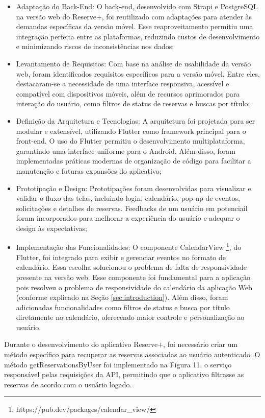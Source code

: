 \documentclass[12pt]{article}
\begin{document}
\begin{itemize}
    \item Adaptação do Back-End: O back-end, desenvolvido com Strapi e PostgreSQL na versão web do Reserve+, foi reutilizado com adaptações para atender às demandas específicas da versão móvel. Esse reaproveitamento permitiu uma integração perfeita entre as plataformas, reduzindo custos de desenvolvimento e minimizando riscos de inconsistências nos dados;
    \item Levantamento de Requisitos: Com base na análise de usabilidade da versão web, foram identificados requisitos específicos para a versão móvel. Entre eles, destacaram-se a necessidade de uma interface responsiva, acessível e compatível com dispositivos móveis, além de recursos aprimorados para interação do usuário, como filtros de status de reservas e buscas por título;
    \item Definição da Arquitetura e Tecnologias: A arquitetura foi projetada para ser modular e extensível, utilizando Flutter como framework principal para o front-end. O uso do Flutter permitiu o desenvolvimento multiplataforma, garantindo uma interface uniforme para o Android. Além disso, foram implementadas práticas modernas de organização de código para facilitar a manutenção e futuras expansões do aplicativo;
    \item Prototipação e Design: Prototipações foram desenvolvidas para visualizar e validar o fluxo das telas, incluindo login, calendário, pop-up de eventos, solicitações e detalhes de reservas. Feedbacks de um usuário em potenciail foram incorporados para melhorar a experiência do usuário e adequar o design às expectativas;
    \item Implementação das Funcionalidades: O componente CalendarView \footnote{https://pub.dev/packages/calendar\_view/}, do Flutter, foi integrado para exibir e gerenciar eventos no formato de calendário. Essa escolha solucionou o problema de falta de responsividade presente na versão web. Esse componente foi fundamental para a aplicação pois resolveu o problema de responsividade do calendário da aplicação Web (conforme explicado na Seção \ref{sec:introduction}). Além disso, foram adicionadas funcionalidades como filtros de status e busca por título diretamente no calendário, oferecendo maior controle e personalização ao usuário.
\end{itemize}

Durante o desenvolvimento do aplicativo Reserve+, foi necessário criar um método específico para recuperar as reservas associadas ao usuário autenticado. O método getReservationsByUser foi implementado na Figura 11, o serviço responsável pelas requisições da API, permitindo que o aplicativo filtrasse as reservas de acordo com o usuário logado.
\end{document}
